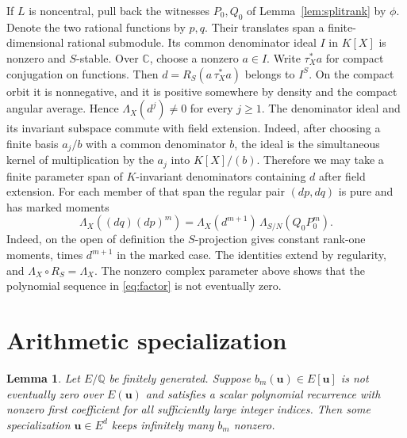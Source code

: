 \documentclass[11pt]{article}
\newtheorem{lemma}[theorem]{Lemma}
\newcommand{\CC}{\mathbb C}
\newcommand{\QQ}{\mathbb Q}
\begin{document}
If \(L\) is noncentral, pull back the witnesses \(P_0,Q_0\) of
Lemma~\ref{lem:splitrank} by \(\phi\). Denote the two rational functions
by \(p,q\). Their translates span a finite-dimensional rational
submodule. Its common denominator ideal \(I\) in \(K[X]\) is nonzero
and \(S\)-stable. Over \(\CC\), choose a nonzero \(a\in I\). Write
\(\tau_X^*a\) for compact conjugation on functions.
Then \(d=R_S(a\,\tau_X^*a)\) belongs to \(I^S\).
On the compact orbit it is nonnegative, and it is positive somewhere
by density and the compact angular average. Hence
\(\Lambda_X(d^j)\ne0\) for every \(j\ge1\). The denominator ideal
and its invariant subspace commute with field extension. Indeed,
after choosing a finite basis \(a_j/b\) with a common denominator
\(b\), the ideal is the simultaneous kernel of multiplication
by the \(a_j\) into \(K[X]/(b)\). Therefore we may take a finite
parameter span of \(K\)-invariant denominators containing \(d\)
after field extension. For each member of that span the regular pair
\((dp,dq)\) is pure and has marked moments
\begin{equation}\label{eq:factor}
 \Lambda_X((dq)(dp)^m)
    =\Lambda_X(d^{m+1})\,\Lambda_{S/N}(Q_0P_0^m).
\end{equation}
Indeed, on the open of definition the \(S\)-projection gives constant
rank-one moments, times \(d^{m+1}\) in the marked case. The identities
extend by regularity, and \(\Lambda_X\circ R_S=\Lambda_X\).
The nonzero complex parameter above shows that the polynomial sequence
in \eqref{eq:factor} is not eventually zero.

\section{Arithmetic specialization}\label{sec:arithmetic}

\begin{lemma}\label{lem:specialize}
Let \(E/\QQ\) be finitely generated. Suppose
\(b_m(\boldsymbol u)\in E[\boldsymbol u]\) is not eventually zero over
\(E(\boldsymbol u)\) and satisfies a scalar polynomial recurrence
with nonzero first coefficient for all sufficiently large integer
indices. Then some specialization \(\boldsymbol u\in E^d\) keeps
infinitely many \(b_m\) nonzero.
\end{lemma}
\end{document}
